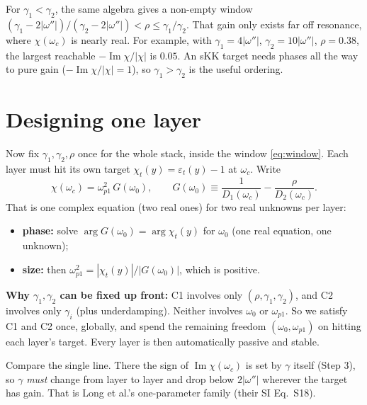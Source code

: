\documentclass[11pt]{article}
\newcommand{\wi}{|\omega''|}          %
\newcommand{\wpa}{\omega_{p1}}
\renewcommand{\Im}{\operatorname{Im}}
\begin{document}
\begin{aside}
For $\gamma_1<\gamma_2$, the same algebra gives a non-empty window $(\gamma_1-2\wi)/(\gamma_2-2\wi)<\rho\le\gamma_1/\gamma_2$.
That gain only exists far off resonance, where $\chi(\omega_c)$ is nearly real.
For example, with $\gamma_1=4\wi$, $\gamma_2=10\wi$, $\rho=0.38$, the largest reachable $-\Im\chi/|\chi|$ is $0.05$.
An sKK target needs phases all the way to pure gain ($-\Im\chi/|\chi|=1$), so $\gamma_1>\gamma_2$ is the useful ordering.
\end{aside}

\section{Designing one layer}\label{sec:design}
Now fix $\gamma_1,\gamma_2,\rho$ once for the whole stack, inside the window \eqref{eq:window}. Each layer must hit its own target $\chi_t(y)=\varepsilon_t(y)-1$ at $\omega_c$. Write
\begin{equation}
  \chi(\omega_c) = \wpa^2\,G(\omega_0),\qquad
  G(\omega_0) \equiv \frac{1}{D_1(\omega_c)} - \frac{\rho}{D_2(\omega_c)} .
\end{equation}
That is one complex equation (two real ones) for two real unknowns per layer:
\begin{itemize}
  \item \textbf{phase:} solve $\arg G(\omega_0) = \arg\chi_t(y)$ for $\omega_0$ (one real equation, one unknown);
  \item \textbf{size:} then $\wpa^2 = |\chi_t(y)|/|G(\omega_0)|$, which is positive.
\end{itemize}
\begin{result}
\textbf{Why $\gamma_1,\gamma_2$ can be fixed up front:} C1 involves only $(\rho,\gamma_1,\gamma_2)$, and C2 involves only $\gamma_i$ (plus underdamping).
Neither involves $\omega_0$ or $\wpa$.
So we satisfy C1 and C2 once, globally, and spend the remaining freedom $(\omega_0,\wpa)$ on hitting each layer's target.
Every layer is then automatically passive and stable.
\end{result}
\noindent Compare the single line. There the sign of $\Im\chi(\omega_c)$ is set by $\gamma$ itself (Step 3), so $\gamma$ \emph{must} change from layer to layer and drop below $2\wi$ wherever the target has gain.
That is Long et al.'s one-parameter family (their SI Eq.~S18).
\end{document}

